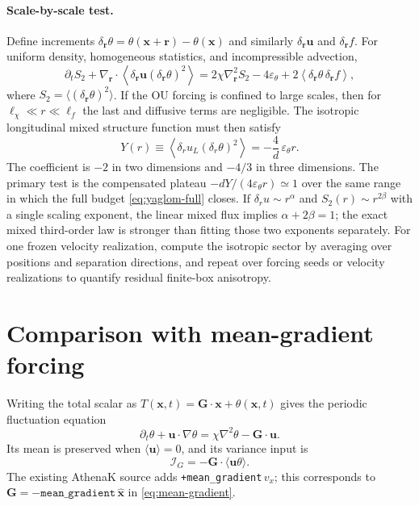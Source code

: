 \documentclass[10pt]{article}
\begin{document}
\paragraph{Scale-by-scale test.}
Define increments $\delta_{\boldsymbol r}\theta
=\theta(\boldsymbol{x}+\boldsymbol r)-\theta(\boldsymbol{x})$ and similarly
$\delta_{\boldsymbol r}\boldsymbol u$ and $\delta_{\boldsymbol r}f$.  For
uniform density, homogeneous statistics, and incompressible advection,
\begin{equation}
 \partial_t S_2+
 \nabla_{\boldsymbol r}\!\cdot
 \left\langle\delta_{\boldsymbol r}\boldsymbol u
                  (\delta_{\boldsymbol r}\theta)^2\right\rangle
 =2\chi\nabla_{\boldsymbol r}^2S_2-4\varepsilon_\theta
  +2\left\langle\delta_{\boldsymbol r}\theta\,
                    \delta_{\boldsymbol r}f\right\rangle ,
 \label{eq:yaglom-full}
\end{equation}
where $S_2=\langle(\delta_{\boldsymbol r}\theta)^2\rangle$.  If the OU forcing
is confined to large scales, then for
$\ell_\chi\ll r\ll\ell_f$ the last and diffusive terms are negligible.  The
isotropic longitudinal mixed structure function must then satisfy
\begin{equation}
 Y(r)\equiv
 \left\langle\delta_ru_L(\delta_r\theta)^2\right\rangle
 =-\frac{4}{d}\,\varepsilon_\theta r .
 \label{eq:yaglom}
\end{equation}
The coefficient is $-2$ in two dimensions and $-4/3$ in three dimensions.
The primary test is the compensated plateau
$-dY/(4\varepsilon_\theta r)\simeq1$ over the same range in which the full
budget \eqref{eq:yaglom-full} closes.  If
$\delta_ru\sim r^\alpha$ and
$S_2(r)\sim r^{2\beta}$ with a single scaling exponent, the linear mixed
flux implies $\alpha+2\beta=1$; the exact mixed third-order law is stronger
than fitting those two exponents separately.
For one frozen velocity realization, compute the isotropic sector by
averaging over positions and separation directions, and repeat over forcing
seeds or velocity realizations to quantify residual finite-box anisotropy.

\section{Comparison with mean-gradient forcing}

Writing the total scalar as
$T(\boldsymbol{x},t)=\boldsymbol G\!\cdot\boldsymbol{x}+\theta(\boldsymbol{x},t)$
gives the periodic fluctuation equation
\begin{equation}
 \partial_t\theta+\boldsymbol u\!\cdot\nabla\theta
 =\chi\nabla^2\theta-\boldsymbol G\!\cdot\boldsymbol u .
 \label{eq:mean-gradient}
\end{equation}
Its mean is preserved when $\langle\boldsymbol u\rangle=0$, and its variance
input is
\begin{equation}
 \mathcal I_G=-\boldsymbol G\!\cdot\langle\boldsymbol u\theta\rangle .
\end{equation}
The existing AthenaK source adds
\texttt{+mean\_gradient}$\,v_x$; this corresponds to
$\boldsymbol G=-\texttt{mean\_gradient}\,\hat{\boldsymbol x}$ in
\eqref{eq:mean-gradient}.
\end{document}
